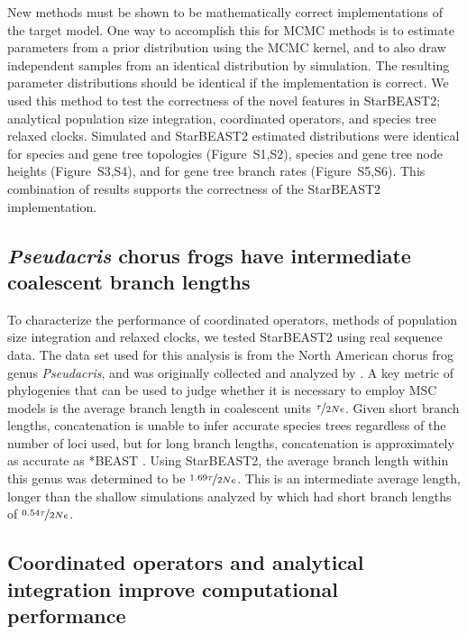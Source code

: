 \documentclass[12pt]{article}
\begin{document}
New methods must be shown to be mathematically correct implementations of the
target model. One way to accomplish this for MCMC methods is to estimate
parameters from a prior distribution using the MCMC kernel, and to also draw
independent samples from an identical distribution by simulation. The resulting
parameter distributions should be identical if the implementation is correct. We
used this method to test the correctness of the novel features in StarBEAST2;
analytical population size integration, coordinated operators, and species tree
relaxed clocks. Simulated and StarBEAST2 estimated distributions were identical
for species and gene tree topologies (Figure~S1,S2), species and gene tree node
heights (Figure~S3,S4), and for gene tree branch rates (Figure~S5,S6). This
combination of results supports the correctness of the StarBEAST2
implementation.

\subsection*{\textit{Pseudacris} chorus frogs have intermediate coalescent branch lengths}

To characterize the performance of coordinated operators, methods of population size
integration and relaxed clocks, we tested StarBEAST2 using real sequence data.
The data set used for this analysis is from the North American chorus frog genus
\textit{Pseudacris}, and was originally collected and analyzed by
\cite{Barrow201478}. A key metric of phylogenies that can be used to judge
whether it is necessary to employ MSC models is the average
branch length in coalescent units $\nicefrac{\tau}{2Ne}$. Given short branch
lengths, concatenation is unable to infer accurate species trees regardless of
the number of loci used, but for long branch lengths, concatenation is
approximately as accurate as *BEAST \citep{Ogilvie01052016}. Using StarBEAST2,
the average branch length within this genus was determined to be
$\nicefrac{1.69\tau}{2Ne}$. This is an intermediate average length, longer than
the shallow simulations analyzed by \cite{Ogilvie01052016} which had short
branch lengths of $\nicefrac{0.54\tau}{2Ne}$.

\subsection*{Coordinated operators and analytical integration improve computational performance}
\end{document}
